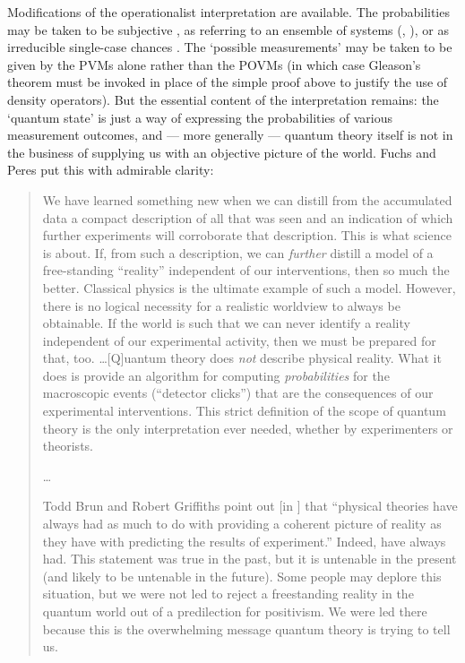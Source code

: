 \documentclass[12pt]{article}
\begin{document}
Modifications of the operationalist interpretation are available. The probabilities may be taken to be subjective \cite{cavesetalprobability}, as referring to an ensemble of systems (, ), or as irreducible single-case chances \cite{fuchsperes}. The `possible measurements' may be taken to be given by the PVMs alone rather than the POVMs (in which case Gleason's theorem must be invoked in place of the simple proof above to justify the use of density operators). But the essential content of the interpretation remains: the `quantum state' is just a way of expressing the probabilities of various measurement outcomes, and --- more generally --- quantum theory itself is not in the business of supplying us with an objective picture of the world. Fuchs and Peres put this with admirable clarity: 
\begin{quote}
We have learned something new when we can distill from the accumulated data a compact description of all that was seen and an indication of which further experiments will corroborate that description. This is what science is about. If, from such a description, we can \emph{further} distill a model of a free-standing ``reality'' independent of our interventions, then so much the better. Classical physics is the ultimate example of such a model. However, there is no logical necessity for a realistic worldview to always be obtainable. If the world is such that we can never identify a reality independent of our experimental activity, then we must be prepared for that, too. \ldots [Q]uantum theory does \emph{not} describe physical reality. What it does is provide an algorithm for computing \emph{probabilities} for the macroscopic events (``detector clicks'') that are the consequences of our experimental interventions. This strict definition of the scope of quantum theory is the only interpretation ever needed, whether by experimenters or theorists. \cite{fuchsperes}

\ldots

Todd Brun and Robert Griffiths point out [in ] that ``physical theories have always had as much to do with providing a coherent picture of reality as they have with predicting the results of experiment.'' Indeed, have always had. This statement was true in the past, but it is untenable in the present (and likely to be untenable in the future). Some people may deplore this situation, but we were not led to reject a freestanding reality in the quantum world out of a predilection for positivism. We were led there because this is the overwhelming message quantum theory is trying to tell us. 
\cite{fuchsperesreply}
\end{quote}
\end{document}
